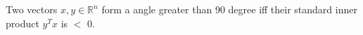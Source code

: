 Two vectors $x, y \in \mathbb{R}^n$ form a angle greater than 90 degree iff their standard inner product $y^T x$ is $<$ 0.  
